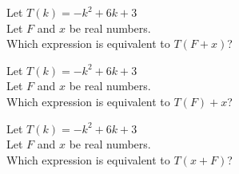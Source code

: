 \documentclass{ximera}
\author{Lee Wayand}
\begin{document}
\begin{exercise}




\begin{question}
Let $T(k) = -k^2 + 6k + 3$ \\

Let $F$ and $x$ be real numbers. \\

Which expression is equivalent to $T(F+x)$?


\begin{multipleChoice}
\end{multipleChoice}

\end{question}









\begin{question}
Let $T(k) = -k^2 + 6k + 3$ \\

Let $F$ and $x$ be real numbers. \\

Which expression is equivalent to $T(F)+x$?


\begin{multipleChoice}
\end{multipleChoice}

\end{question}










\begin{question}
Let $T(k) = -k^2 + 6k + 3$ \\

Let $F$ and $x$ be real numbers. \\

Which expression is equivalent to $T(x+F)$?


\begin{multipleChoice}
\end{multipleChoice}


\end{question}
\end{exercise}
\end{document}

